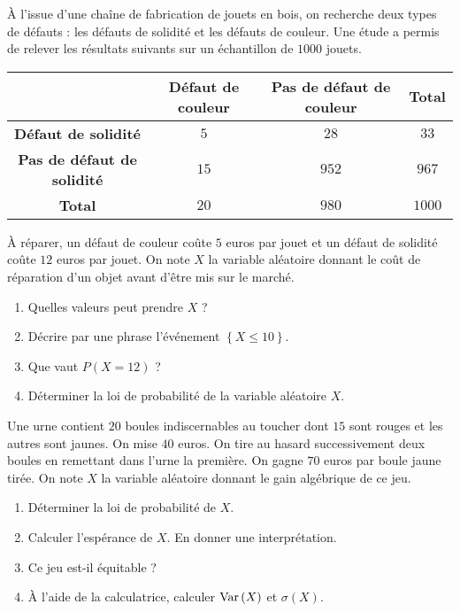 \documentclass[11pt]{article}
\begin{document}
\begin{exo}
À l'issue d'une chaîne de fabrication de jouets en bois,
on recherche deux types de défauts : les défauts de solidité et les défauts de
couleur. Une étude a permis de relever les résultats suivants sur un échantillon
de $1000$ jouets.
\begin{center}
\renewcommand{\arraystretch}{2}
\begin{tabular}{|c|c|c|c|}
  \cline{2-4}
  \multicolumn{1}{c|}{} & \textbf{Défaut de couleur} & \textbf{Pas de défaut de
  couleur} &
  \textbf{Total} \\
  \hline
  \textbf{Défaut de solidité} & $5$ & $28$ & $33$ \\
  \hline
  \textbf{Pas de défaut de solidité} & $15$ & $952$ & $967$ \\
  \hline
  \textbf{Total} &  $20$ & $980$ & $1000$ \\
  \hline
\end{tabular}
\end{center}
À réparer, un défaut de couleur coûte $5$ euros par jouet et un défaut de solidité coûte
$12$ euros par jouet. On note $X$ la variable aléatoire donnant le coût de
réparation d'un objet avant d'être mis sur le marché.
\begin{enumerate}
  \item Quelles valeurs peut prendre $X$ ?
  \item Décrire par une phrase l'événement $\left\{ X\leq10 \right\}$.
  \item Que vaut $P\left( X=12 \right)$ ?
  \item Déterminer la loi de probabilité de la variable aléatoire $X$.
\end{enumerate}
\end{exo}

\begin{exo}
Une urne contient $20$ boules indiscernables au toucher
dont $15$ sont rouges et les autres sont jaunes. On mise $40$ euros. On tire au
hasard successivement deux boules en remettant dans l'urne la première. On gagne
$70$ euros par boule jaune tirée. On note $X$ la variable aléatoire donnant le
gain algébrique de ce jeu.
\begin{enumerate}
  \item Déterminer la loi de probabilité de $X$.
  \item Calculer l'espérance de $X$. En donner une interprétation.
  \item Ce jeu est-il équitable ?
  \item À l'aide de la calculatrice, calculer $\operatorname{Var}\left( X \right)$ et
    $\sigma\left( X \right)$.
\end{enumerate}
\end{exo}
\end{document}
